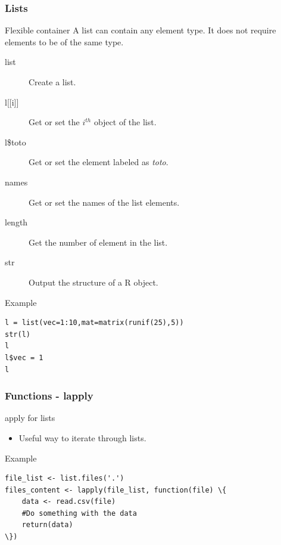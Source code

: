 \documentclass[10pt]{beamer}
\newenvironment{xframe}[2][]
  {\begin{frame}[fragile,environment=xframe,#1]
  \frametitle{#2}}
  {\end{frame}}
\begin{document}
\begin{xframe}{Lists}
  \begin{block}{Flexible container}
    A {\sf list} can contain any element type. It does not require elements to be of
    the same type.
    \begin{description}
      \item[list] Create a {\sf list}.
      \item[{l[[i]]} ] Get or set the $i^{th}$ object of the {\sf list}.
      \item[l\$toto] Get or set the element labeled as {\it toto}.
      \item[names] Get or set the names of the {\sf list} elements.
      \item[length] Get the number of element in the {\sf list}.
      \item[str] Output the structure of a R object.
    \end{description}
  \end{block}
  \begin{exampleblock}{Example}
\begin{verbatim}
l = list(vec=1:10,mat=matrix(runif(25),5))
str(l)
l
l$vec = 1
l
\end{verbatim}
  \end{exampleblock}
\end{xframe}


\begin{xframe}{Functions - {\sf lapply}}
  \begin{block}{apply for {\sf list}s}
    \begin{itemize}
    \item Useful way to iterate through {\sf list}s.
    \end{itemize}
  \end{block}
  \begin{exampleblock}{Example}
\begin{verbatim}
file_list <- list.files('.')
files_content <- lapply(file_list, function(file) \{
	data <- read.csv(file)
	#Do something with the data
	return(data)
\})
\end{verbatim}  
  \end{exampleblock}
\end{xframe}

\end{document}
